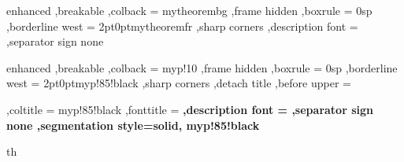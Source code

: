 {%
	enhanced
	,breakable
	,colback = mytheorembg
	,frame hidden
	,boxrule = 0sp
	,borderline west = {2pt}{0pt}{mytheoremfr}
	,sharp corners
	,description font = \mdseries
	,separator sign none
}


{%
	enhanced
	,breakable
	,colback = myp!10
	,frame hidden
	,boxrule = 0sp
	,borderline west = {2pt}{0pt}{myp!85!black}
	,sharp corners
	,detach title
	,before upper = \tcbtitle\par\smallskip
	,coltitle = myp!85!black
	,fonttitle = \bfseries\sffamily
	,description font = \mdseries
	,separator sign none
	,segmentation style={solid, myp!85!black}
}
{th}
%

